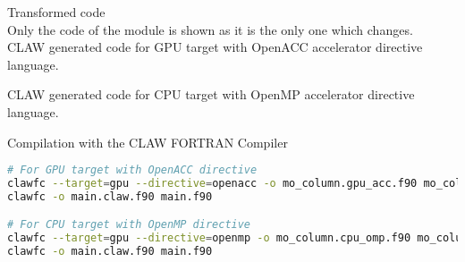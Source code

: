 Transformed code\\
Only the code of the module is shown as it is the only one which changes.\\

CLAW generated code for GPU target with OpenACC accelerator directive language.


CLAW generated code for CPU target with OpenMP accelerator directive language.


Compilation with the CLAW FORTRAN Compiler
\begin{lstlisting}[language=bash]
# For GPU target with OpenACC directive
clawfc --target=gpu --directive=openacc -o mo_column.gpu_acc.f90 mo_column.f90
clawfc -o main.claw.f90 main.f90

# For CPU target with OpenMP directive
clawfc --target=gpu --directive=openmp -o mo_column.cpu_omp.f90 mo_column.f90
clawfc -o main.claw.f90 main.f90
\end{lstlisting}
